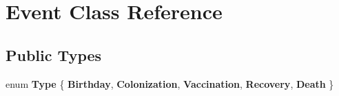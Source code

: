 \hypertarget{class_event}{}\section{Event Class Reference}
\label{class_event}
\subsection*{Public Types}
\begin{DoxyCompactItemize}
\item 
\mbox{\label{class_event_a2abf13b5be49315e9e362af02029f058}} 
enum {\bfseries Type} \{ \newline
{\bfseries Birthday}, 
{\bfseries Colonization}, 
{\bfseries Vaccination}, 
{\bfseries Recovery}, 
\newline
{\bfseries Death}
 \}
\end{DoxyCompactItemize}

